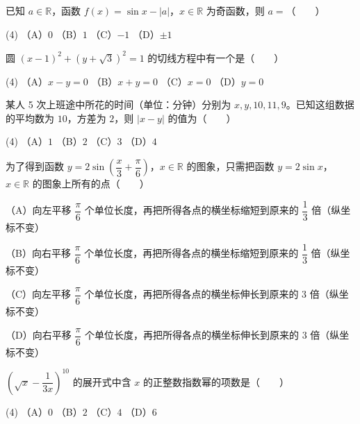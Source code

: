 \begin{question}
已知 $a\in\mathbb R$，函数 $f(x)=\sin x-|a|$，$x\in\mathbb R$ 为奇函数，则 $a=$\mbox{（　　）}

\begin{gkopts}(4)
\task （A）$0$
\task （B）$1$
\task （C）$-1$
\task （D）$\pm1$
\end{gkopts}

\end{question}
\begin{question}
圆 $(x-1)^2+(y+\sqrt3)^2=1$ 的切线方程中有一个是\mbox{（　　）}

\begin{gkopts}(4)
\task （A）$x-y=0$
\task （B）$x+y=0$
\task （C）$x=0$
\task （D）$y=0$
\end{gkopts}

\end{question}
\begin{question}
某人 5 次上班途中所花的时间（单位：分钟）分别为 $x,y,10,11,9$。已知这组数据的平均数为 $10$，方差为 $2$，则 $|x-y|$ 的值为\mbox{（　　）}

\begin{gkopts}(4)
\task （A）$1$
\task （B）$2$
\task （C）$3$
\task （D）$4$
\end{gkopts}

\end{question}
\begin{question}
为了得到函数 $y=2\sin\left(\dfrac{x}{3}+\dfrac{\pi}{6}\right)$，$x\in\mathbb R$ 的图象，只需把函数 $y=2\sin x$，$x\in\mathbb R$ 的图象上所有的点\mbox{（　　）}

（A）向左平移 $\dfrac{\pi}{6}$ 个单位长度，再把所得各点的横坐标缩短到原来的 $\dfrac13$ 倍（纵坐标不变）

（B）向右平移 $\dfrac{\pi}{6}$ 个单位长度，再把所得各点的横坐标缩短到原来的 $\dfrac13$ 倍（纵坐标不变）

（C）向左平移 $\dfrac{\pi}{6}$ 个单位长度，再把所得各点的横坐标伸长到原来的 $3$ 倍（纵坐标不变）

（D）向右平移 $\dfrac{\pi}{6}$ 个单位长度，再把所得各点的横坐标伸长到原来的 $3$ 倍（纵坐标不变）

\end{question}
\begin{question}
$\left(\sqrt{x}-\dfrac{1}{3x}\right)^{10}$ 的展开式中含 $x$ 的正整数指数幂的项数是\mbox{（　　）}

\begin{gkopts}(4)
\task （A）$0$
\task （B）$2$
\task （C）$4$
\task （D）$6$
\end{gkopts}

\end{question}
